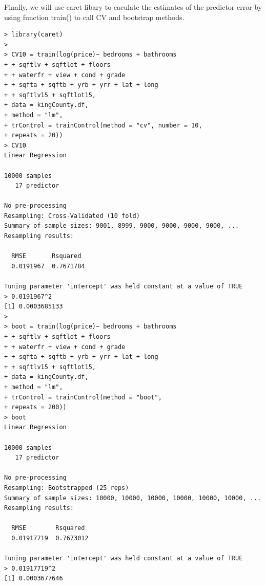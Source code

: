 \documentclass{article}%
\begin{document}
Finally, we will use caret libary to caculate the estimates of the predictor error by using function train() to call CV and bootstrap methods.
\begin{verbatim}
> library(caret)
>
> CV10 = train(log(price)~ bedrooms + bathrooms
+ + sqftlv + sqftlot + floors
+ + waterfr + view + cond + grade
+ + sqfta + sqftb + yrb + yrr + lat + long
+ + sqftlv15 + sqftlot15,
+ data = kingCounty.df,
+ method = "lm",
+ trControl = trainControl(method = "cv", number = 10,
+ repeats = 20))
> CV10
Linear Regression

10000 samples
   17 predictor

No pre-processing
Resampling: Cross-Validated (10 fold)
Summary of sample sizes: 9001, 8999, 9000, 9000, 9000, 9000, ...
Resampling results:

  RMSE       Rsquared
  0.0191967  0.7671784

Tuning parameter 'intercept' was held constant at a value of TRUE
> 0.0191967^2
[1] 0.0003685133
>
> boot = train(log(price)~ bedrooms + bathrooms
+ + sqftlv + sqftlot + floors
+ + waterfr + view + cond + grade
+ + sqfta + sqftb + yrb + yrr + lat + long
+ + sqftlv15 + sqftlot15,
+ data = kingCounty.df,
+ method = "lm",
+ trControl = trainControl(method = "boot",
+ repeats = 200))
> boot
Linear Regression

10000 samples
   17 predictor

No pre-processing
Resampling: Bootstrapped (25 reps)
Summary of sample sizes: 10000, 10000, 10000, 10000, 10000, 10000, ...
Resampling results:

  RMSE        Rsquared
  0.01917719  0.7673012

Tuning parameter 'intercept' was held constant at a value of TRUE
> 0.01917719^2
[1] 0.0003677646
\end{verbatim}
\end{document}
